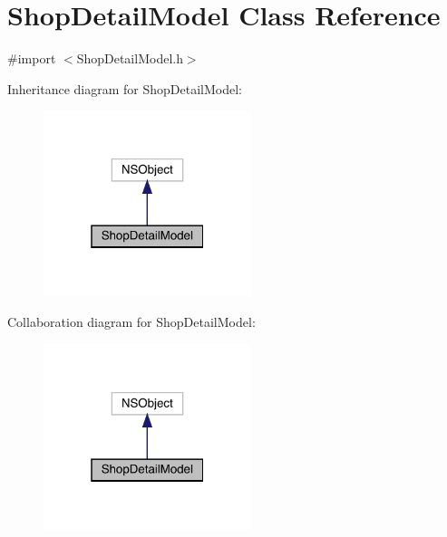 \hypertarget{interface_shop_detail_model}{}\section{Shop\+Detail\+Model Class Reference}
\label{interface_shop_detail_model}


{\ttfamily \#import $<$Shop\+Detail\+Model.\+h$>$}



Inheritance diagram for Shop\+Detail\+Model\+:\nopagebreak
\begin{figure}[H]
\begin{center}
\leavevmode
\includegraphics[width=172pt]{interface_shop_detail_model__inherit__graph}
\end{center}
\end{figure}


Collaboration diagram for Shop\+Detail\+Model\+:\nopagebreak
\begin{figure}[H]
\begin{center}
\leavevmode
\includegraphics[width=172pt]{interface_shop_detail_model__coll__graph}
\end{center}
\end{figure}
